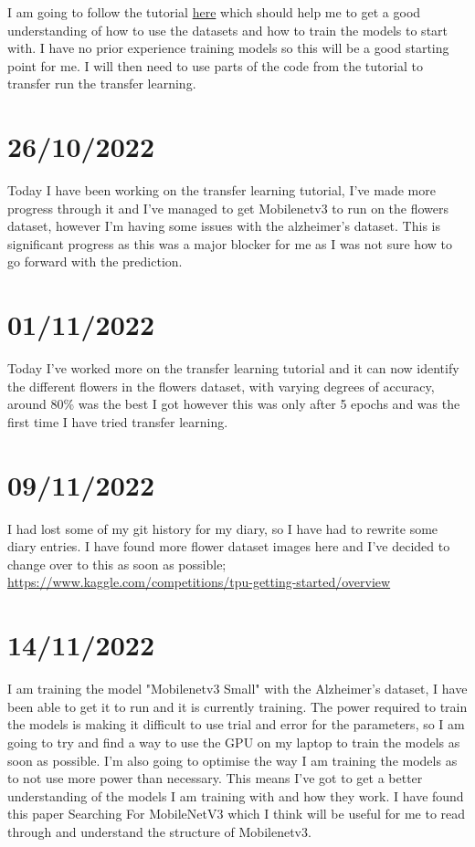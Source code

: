 \documentclass[]{final_report}
\begin{document}
I am going to follow the tutorial \href{https://www.tensorflow.org/tutorials/images/classification}{here}
which should help me to get a good understanding of how to use the datasets and how to train the models to start with.
I have no prior experience training models so this will be a good starting point for me.
I will then need to use parts of the code from the tutorial to transfer run the transfer learning.

\section*{26/10/2022}


Today I have been working on the transfer learning tutorial, I've made more progress through it and I've managed to get
Mobilenetv3 to run on the flowers dataset, however I'm having some issues with the alzheimer's dataset.
This is significant progress as this was a major blocker for me as I was not sure how to go forward with the prediction.

\section*{01/11/2022}

Today I've worked more on the transfer learning tutorial and it can now identify the different flowers in the flowers dataset,
with varying degrees of accuracy, around 80\% was the best I got however this was only after 5 epochs and was the first time I have tried transfer learning.

\section*{09/11/2022}


I had lost some of my git history for my diary, so I have had to rewrite some diary entries.
I have found more flower dataset images here and I've decided to change over to this as soon as possible;
\href{https://www.kaggle.com/competitions/tpu-getting-started/overview}{https://www.kaggle.com/competitions/tpu-getting-started/overview}

\section*{14/11/2022}

I am training the model "Mobilenetv3 Small" with the Alzheimer's dataset, I have been able to get it to run and it is currently training.
The power required to train the models is making it difficult to use trial and error for the parameters, so I am going to try and find a way to use the GPU on my laptop to train the models as soon as possible.
I'm also going to optimise the way I am training the models as to not use more power than necessary. This means I've got to get a better understanding of the models I am training with and how they work.
I have found this paper Searching For MobileNetV3\cite{DBLP:journals/corr/abs-1905-02244} which I think will be useful for me to read through and understand the structure of Mobilenetv3.
\end{document}
